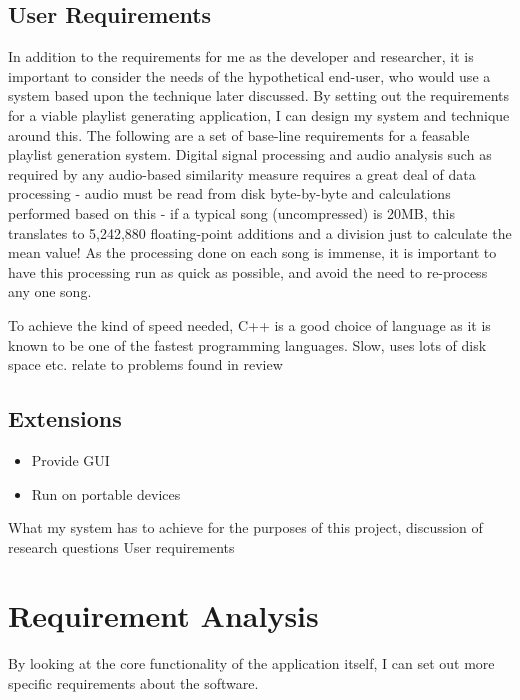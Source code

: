 \subsection{User Requirements}
In addition to the requirements for me as the developer and researcher, it is important to consider the needs of the hypothetical end-user, who would use a system based upon the technique later discussed. By setting out the requirements for a viable playlist generating application, I can design my system and technique around this. The following are a set of base-line requirements for a feasable playlist generation system.
Digital signal processing and audio analysis such as required by any audio-based similarity measure requires a great deal of data processing - audio must be read from disk byte-by-byte and calculations performed based on this - if a typical song (uncompressed) is 20MB, this translates to 5,242,880 floating-point additions and a division just to calculate the mean value! As the processing done on each song is immense, it is important to have this processing run as quick as possible, and avoid the need to re-process any one song.

To achieve the kind of speed needed, C++ is a good choice of language as it is known to be one of the fastest programming languages. 
Slow, uses lots of disk space etc.
relate to problems found in review
\subsection{Extensions}
\begin{itemize}
	\item Provide GUI
	\item Run on portable devices
\end{itemize}
What my system has to achieve for the purposes of this project, discussion of research questions
User requirements
\section{Requirement Analysis}
By looking at the core functionality of the application itself,
I can set out more specific requirements about the software.
